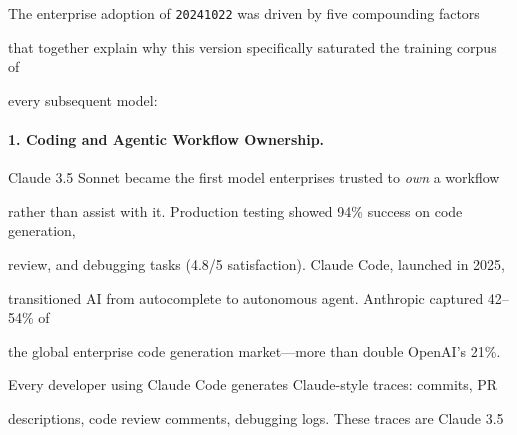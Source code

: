 The enterprise adoption of \texttt{20241022} was driven by five compounding factors





that together explain why this version specifically saturated the training corpus of





every subsequent model:











\paragraph{1. Coding and Agentic Workflow Ownership.}





Claude 3.5 Sonnet became the first model enterprises trusted to \emph{own} a workflow





rather than assist with it. Production testing showed 94\% success on code generation,





review, and debugging tasks (4.8/5 satisfaction). Claude Code, launched in 2025,





transitioned AI from autocomplete to autonomous agent. Anthropic captured 42--54\% of





the global enterprise code generation market---more than double OpenAI's 21\%.











Every developer using Claude Code generates Claude-style traces: commits, PR





descriptions, code review comments, debugging logs. These traces are Claude 3.5





